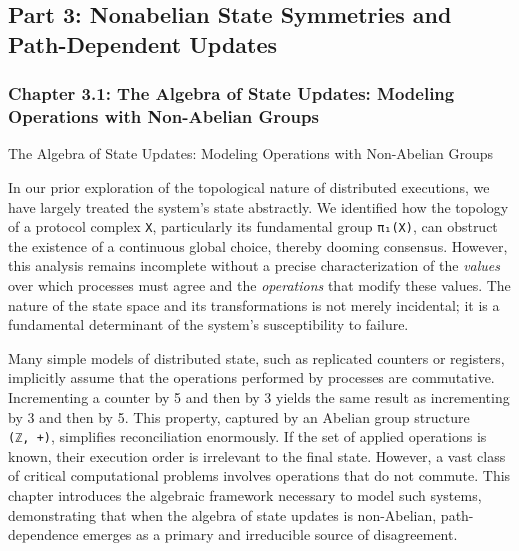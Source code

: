 \documentclass[
]{article}
\begin{document}
\subsection{Part 3: Nonabelian State Symmetries and Path-Dependent
Updates}\label{part-3-nonabelian-state-symmetries-and-path-dependent-updates}

\protect{}\label{part-3-Nonabelian_State_Symmetries_and_Path-Dep}{}

\subsubsection{Chapter 3.1: The Algebra of State Updates: Modeling
Operations with Non-Abelian
Groups}\label{chapter-3.1-the-algebra-of-state-updates-modeling-operations-with-non-abelian-groups}

\protect{}\label{chapter-3-1-The_Algebra_of_State_Updates__Modeling_O}{}

The Algebra of State Updates: Modeling Operations with Non-Abelian
Groups

In our prior exploration of the topological nature of distributed
executions, we have largely treated the system's state abstractly. We
identified how the topology of a protocol complex \texttt{X},
particularly its fundamental group \texttt{π₁(X)}, can obstruct the
existence of a continuous global choice, thereby dooming consensus.
However, this analysis remains incomplete without a precise
characterization of the \emph{values} over which processes must agree
and the \emph{operations} that modify these values. The nature of the
state space and its transformations is not merely incidental; it is a
fundamental determinant of the system's susceptibility to failure.

Many simple models of distributed state, such as replicated counters or
registers, implicitly assume that the operations performed by processes
are commutative. Incrementing a counter by 5 and then by 3 yields the
same result as incrementing by 3 and then by 5. This property, captured
by an Abelian group structure \texttt{(ℤ,\ +)}, simplifies
reconciliation enormously. If the set of applied operations is known,
their execution order is irrelevant to the final state. However, a vast
class of critical computational problems involves operations that do not
commute. This chapter introduces the algebraic framework necessary to
model such systems, demonstrating that when the algebra of state updates
is non-Abelian, path-dependence emerges as a primary and irreducible
source of disagreement.
\end{document}
